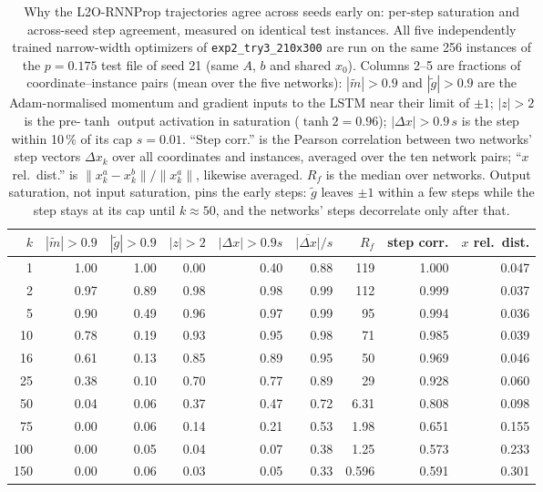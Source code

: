 \begin{table}[htbp]
\centering
\small
\caption{Why the L2O-RNNProp trajectories agree across seeds early on: per-step saturation and across-seed step agreement, measured on identical test instances. All five independently trained narrow-width optimizers of \texttt{exp2\_try3\_210x300} are run on the same 256 instances of the $p = 0.175$ test file of seed 21 (same $A$, $b$ and shared $x_0$). Columns 2--5 are fractions of coordinate--instance pairs (mean over the five networks): $|\tilde m| > 0.9$ and $|\tilde g| > 0.9$ are the Adam-normalised momentum and gradient inputs to the LSTM near their limit of $\pm 1$; $|z| > 2$ is the pre-$\tanh$ output activation in saturation ($\tanh 2 = 0.96$); $|\Delta x| > 0.9\,s$ is the step within 10\,\% of its cap $s = 0.01$. ``Step corr.'' is the Pearson correlation between two networks' step vectors $\Delta x_k$ over all coordinates and instances, averaged over the ten network pairs; ``$x$ rel.\ dist.'' is $\|x_k^a - x_k^b\| / \|x_k^a\|$, likewise averaged. $R_f$ is the median over networks. Output saturation, not input saturation, pins the early steps: $\tilde g$ leaves $\pm 1$ within a few steps while the step stays at its cap until $k \approx 50$, and the networks' steps decorrelate only after that.}
\label{tab:rnnprop-saturation}
\begin{tabular}{@{} r rrrr r r rr @{}}
\toprule
$k$ & $|\tilde m|>0.9$ & $|\tilde g|>0.9$ & $|z|>2$ & $|\Delta x|>0.9s$ & $\overline{|\Delta x|}/s$ & $R_f$ & step corr. & $x$ rel.\ dist. \\
\midrule
1 & 1.00 & 1.00 & 0.00 & 0.40 & 0.88 & 119 & 1.000 & 0.047 \\
2 & 0.97 & 0.89 & 0.98 & 0.98 & 0.99 & 112 & 0.999 & 0.037 \\
5 & 0.90 & 0.49 & 0.96 & 0.97 & 0.99 & 95 & 0.994 & 0.036 \\
10 & 0.78 & 0.19 & 0.93 & 0.95 & 0.98 & 71 & 0.985 & 0.039 \\
16 & 0.61 & 0.13 & 0.85 & 0.89 & 0.95 & 50 & 0.969 & 0.046 \\
25 & 0.38 & 0.10 & 0.70 & 0.77 & 0.89 & 29 & 0.928 & 0.060 \\
50 & 0.04 & 0.06 & 0.37 & 0.47 & 0.72 & 6.31 & 0.808 & 0.098 \\
75 & 0.00 & 0.06 & 0.14 & 0.21 & 0.53 & 1.98 & 0.651 & 0.155 \\
100 & 0.00 & 0.05 & 0.04 & 0.07 & 0.38 & 1.25 & 0.573 & 0.233 \\
150 & 0.00 & 0.06 & 0.03 & 0.05 & 0.33 & 0.596 & 0.591 & 0.301 \\

\end{tabular}
\end{table}
